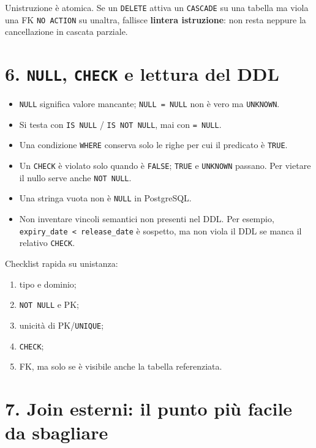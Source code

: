 \documentclass[
  10pt,
  a4paper,
]{article}
\providecommand{\tightlist}{%
  \setlength{\itemsep}{0pt}\setlength{\parskip}{0pt}}
\begin{document}
Un\textquotesingle istruzione è atomica. Se un \texttt{DELETE} attiva un
\texttt{CASCADE} su una tabella ma viola una FK \texttt{NO\ ACTION} su
un\textquotesingle altra, fallisce \textbf{l\textquotesingle intera
istruzione}: non resta neppure la cancellazione in cascata parziale.

\section{\texorpdfstring{6. \texttt{NULL}, \texttt{CHECK} e lettura del
DDL}{6. NULL, CHECK e lettura del DDL}}\label{6-null-check-e-lettura-del-ddl}

\begin{itemize}
\tightlist
\item
  \texttt{NULL} significa valore mancante; \texttt{NULL\ =\ NULL} non è
  vero ma \texttt{UNKNOWN}.
\item
  Si testa con \texttt{IS\ NULL} / \texttt{IS\ NOT\ NULL}, mai con
  \texttt{=\ NULL}.
\item
  Una condizione \texttt{WHERE} conserva solo le righe per cui il
  predicato è \texttt{TRUE}.
\item
  Un \texttt{CHECK} è violato solo quando è \texttt{FALSE};
  \texttt{TRUE} e \texttt{UNKNOWN} passano. Per vietare il nullo serve
  anche \texttt{NOT\ NULL}.
\item
  Una stringa vuota \texttt{\textquotesingle{}\textquotesingle{}} non è
  \texttt{NULL} in PostgreSQL.
\item
  Non inventare vincoli semantici non presenti nel DDL. Per esempio,
  \texttt{expiry\_date\ \textless{}\ release\_date} è sospetto, ma non
  viola il DDL se manca il relativo \texttt{CHECK}.
\end{itemize}

Checklist rapida su un\textquotesingle istanza:

\begin{enumerate}
\def\labelenumi{\arabic{enumi}.}
\tightlist
\item
  tipo e dominio;
\item
  \texttt{NOT\ NULL} e PK;
\item
  unicità di PK/\texttt{UNIQUE};
\item
  \texttt{CHECK};
\item
  FK, ma solo se è visibile anche la tabella referenziata.
\end{enumerate}

\section{7. Join esterni: il punto più facile da
sbagliare}\label{7-join-esterni-il-punto-piuxf9-facile-da-sbagliare}
\end{document}
